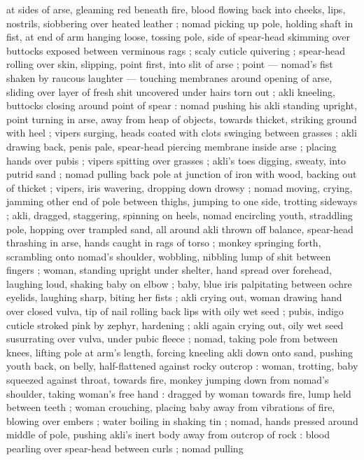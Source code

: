 at sides of arse, gleaming red beneath fire, blood flowing back into 
cheeks, lips, nostrils, siobbering over heated leather ; nomad picking 
up pole, holding shaft in fist, at end of arm hanging loose, tossing 
pole, side of spear-head skimming over buttocks exposed between 
verminous rags ; scaly cuticle quivering ; spear-head rolling over 
skin, slipping, point first, into slit of arse ; point --- nomad's fist 
shaken by raucous laughter --- touching membranes around opening 
of arse, sliding over layer of fresh shit uncovered under hairs torn 
out ; akli kneeling, buttocks closing around point of spear : nomad 
pushing his akli standing upright, point turning in arse, away from 
heap of objects, towards thicket, striking ground with heel ; vipers 
surging, heads coated with clots swinging between grasses ; akli 
drawing back, penis pale, spear-head piercing membrane inside arse 
; placing hands over pubis ; vipers spitting over grasses ; akli's toes 
digging, sweaty, into putrid sand ; nomad pulling back pole at 
junction of iron with wood, backing out of thicket ; vipers, iris 
wavering, dropping down drowsy ; nomad moving, crying, jamming 
other end of pole between thighs, jumping to one side, trotting 
sideways ; akli, dragged, staggering, spinning on heels, nomad 
encircling youth, straddling pole, hopping over trampled sand, all 
around akli thrown off balance, spear-head thrashing in arse, hands 
caught in rags of torso ; monkey springing forth, scrambling onto 
nomad's shoulder, wobbling, nibbling lump of shit between fingers ; 
woman, standing upright under shelter, hand spread over forehead, 
laughing loud, shaking baby on elbow ; baby, blue iris palpitating 
between ochre eyelids, laughing sharp, biting her fists ; akli crying 
out, woman drawing hand over closed vulva, tip of nail rolling back 
lips with oily wet seed ; pubis, indigo cuticle stroked pink by zephyr, 
hardening ; akli again crying out, oily wet seed susurrating over 
vulva, under pubic fleece ; nomad, taking pole from between knees, 
lifting pole at arm's length, forcing kneeling akli down onto sand, 
pushing youth back, on belly, half-flattened against rocky outcrop : 
woman, trotting, baby squeezed against throat, towards fire, monkey 
jumping down from nomad's shoulder, taking woman's free hand : 
dragged by woman towards fire, lump held between teeth ; woman 
crouching, placing baby away from vibrations of fire, blowing over 
embers ; water boiling in shaking tin ; nomad, hands pressed around 
middle of pole, pushing akli's inert body away from outcrop of rock 
: blood pearling over spear-head between curls ; nomad pulling 
